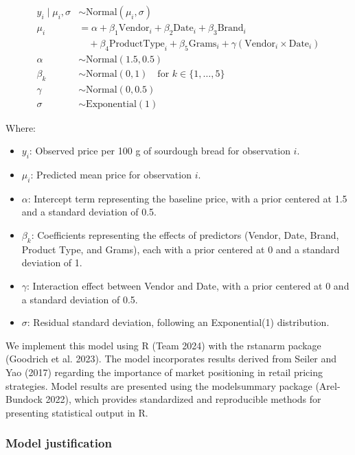 \documentclass[
  letterpaper,
  DIV=11,
  numbers=noendperiod]{scrartcl}
\begin{document}
\begin{align}
y_i \mid \mu_i, \sigma &\sim \text{Normal}(\mu_i, \sigma) \\
\mu_i &= \alpha + \beta_1 \text{Vendor}_i + \beta_2 \text{Date}_i + \beta_3 \text{Brand}_i \\
     &\quad + \beta_4 \text{ProductType}_i + \beta_5 \text{Grams}_i + \gamma (\text{Vendor}_i \times \text{Date}_i) \\
\alpha &\sim \text{Normal}(1.5, 0.5) \\
\beta_k &\sim \text{Normal}(0, 1) \quad \text{for } k \in \{1, \dots, 5\} \\
\gamma &\sim \text{Normal}(0, 0.5) \\
\sigma &\sim \text{Exponential}(1)
\end{align}

Where:

\begin{itemize}
    \item \( y_i \): Observed price per 100 g of sourdough bread for observation \( i \).
    \item \( \mu_i \): Predicted mean price for observation \( i \).
    \item \( \alpha \): Intercept term representing the baseline price, with a prior centered at 1.5 and a standard deviation of 0.5.
    \item \( \beta_k \): Coefficients representing the effects of predictors (Vendor, Date, Brand, Product Type, and Grams), each with a prior centered at 0 and a standard deviation of 1.
    \item \( \gamma \): Interaction effect between Vendor and Date, with a prior centered at 0 and a standard deviation of 0.5.
    \item \( \sigma \): Residual standard deviation, following an Exponential(1) distribution.
\end{itemize}

We implement this model using R (Team 2024) with the rstanarm package
(Goodrich et al. 2023). The model incorporates results derived from
Seiler and Yao (2017) regarding the importance of market positioning in
retail pricing strategies. Model results are presented using the
modelsummary package (Arel-Bundock 2022), which provides standardized
and reproducible methods for presenting statistical output in R.

\subsubsection{Model justification}\label{model-justification}
\end{document}
